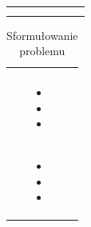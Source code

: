 \begin{minipage}{\textwidth}
\begin{table}[H]
\begin{tabular}{|P{.22\textwidth}|P{.09\textwidth}|P{.09\textwidth}|P{.09\textwidth}|P{.09\textwidth}|P{.09\textwidth}|P{.09\textwidth}|}
                    &        &            &           &             &        &        \\ \hline
                    &        &            &           &             &        &      \\ \hline
                   &        &            &           &             &        &      \\ \hline
        \end{tabular}
    \end{table}
\end{minipage}

\begin{minipage}{\textwidth}
    \begin{table}[H]
        \centering\caption{Sformułowanie problemu \source{\ownwork}\label{tabela:sformulowanie-problemu}}
        \begin{tabular}{|P{.2\textwidth}|p{.7\textwidth}|}

            \hline
             &
             \\
            \hline

             &
             \\
            \hline

             &
            \begin{itemize}
                \item {}
                \item {}
                \item {}
            \end{itemize} \\
            \hline

             &
            \begin{itemize}
                \item {}
                \item {}
                \item {}
            \end{itemize} \\
            \hline
        \end{tabular}
    \end{table}
\end{minipage}

